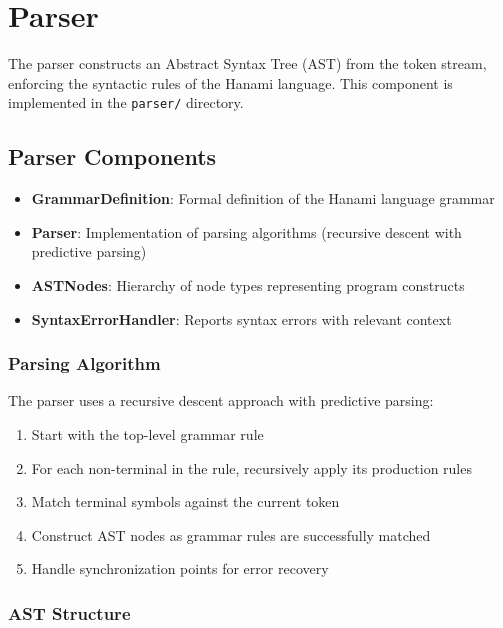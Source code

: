 \documentclass[12pt,a4paper]{article}
\begin{document}
\section{Parser}

The parser constructs an Abstract Syntax Tree (AST) from the token stream, enforcing the syntactic rules of the Hanami language. This component is implemented in the \texttt{parser/} directory.

\subsection{Parser Components}

\begin{itemize}
    \item \textbf{GrammarDefinition}: Formal definition of the Hanami language grammar
    \item \textbf{Parser}: Implementation of parsing algorithms (recursive descent with predictive parsing)
    \item \textbf{ASTNodes}: Hierarchy of node types representing program constructs
    \item \textbf{SyntaxErrorHandler}: Reports syntax errors with relevant context
\end{itemize}

\subsubsection{Parsing Algorithm}

The parser uses a recursive descent approach with predictive parsing:

\begin{enumerate}
    \item Start with the top-level grammar rule
    \item For each non-terminal in the rule, recursively apply its production rules
    \item Match terminal symbols against the current token
    \item Construct AST nodes as grammar rules are successfully matched
    \item Handle synchronization points for error recovery
\end{enumerate}

\subsubsection{AST Structure}
\end{document}
